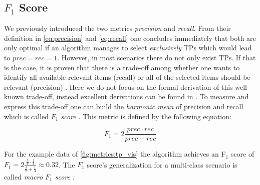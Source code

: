 \subsection{$F_1$ Score}
\label{chp:fundamentals:sec:metrics:subsec:f1_score}

We previously introduced the two metrics \textit{precision} and \textit{recall}.
From their definition in \cref{eq:precision} and \cref{eq:recall} one concludes immediately that both are only optimal if an algorithm manages to select \textit{exclusively} \acp{TP} which would lead to $prec = rec = 1$.
However, in most scenarios there do not only exist \acp{TP}.
If that is the case, it is proven that there is a trade-off among whether one wants to identify all available relevant items (recall) or all of the selected items should be relevant (precision) \parencite{Gordon:1989}.
Here we do not focus on the formal derivation of this well known trade-off, instead excellent derivations can be found in \textcites{Gordon:1989}{Zhu:2004}.
To measure and express this trade-off one can build the \textit{harmonic mean} of precision and recall which is called \textit{$F_1$ score} \parencite{Powers:2011}.
This metric is defined by the following equation:

\begin{equation}\label{eq:f1_score}
    F_1 = 2 \frac{prec \cdot rec}{prec+rec}
\end{equation}

For the example data of \cref{fig:metrics:tp_vis} the algorithm achieves an F$_1$ score of $F_1 = 2 \frac{\frac{3}{7} \cdot \frac{1}{4}}{\frac{3}{7}+\frac{1}{4}} \approx 0.32$.
The $F_1$ score's generalization for a multi-class scenario is called \textit{macro $F_1$ score} \parencite{Opitz:2019}.
